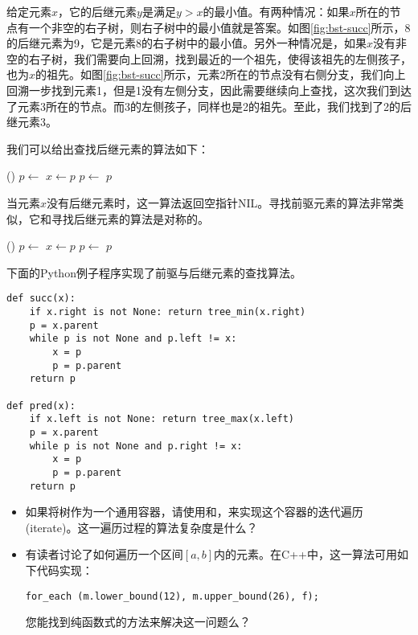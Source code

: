\documentclass[UTF8]{article}
\begin{document}
给定元素$x$，它的后继元素$y$是满足$y>x$的最小值。有两种情况：如果$x$所在的节点有一个非空的右子树，则右子树中的最小值就是答案。如图\ref{fig:bst-succ}所示，8的后继元素为9，它是元素8的右子树中的最小值。另外一种情况是，如果$x$没有非空的右子树，我们需要向上回溯，找到最近的一个祖先，使得该祖先的左侧孩子，也为$x$的祖先。如图\ref{fig:bst-succ}所示，元素2所在的节点没有右侧分支，我们向上回溯一步找到元素1，但是1没有左侧分支，因此需要继续向上查找，这次我们到达了元素3所在的节点。而3的左侧孩子，同样也是2的祖先。至此，我们找到了2的后继元素3。

我们可以给出查找后继元素的算法如下：

\begin{algorithmic}[1]
    \State \Return {}()
  \Else
    \State $p \gets $ 
      \State $x \gets p$
      \State $p \gets $ 
    \EndWhile
    \State \Return $p$
  \EndIf
\EndFunction
\end{algorithmic}

当元素$x$没有后继元素时，这一算法返回空指针NIL。寻找前驱元素的算法非常类似，它和寻找后继元素的算法是对称的。

\begin{algorithmic}[1]
    \State \Return {}()
  \Else
    \State $p \gets $ 
      \State $x \gets p$
      \State $p \gets $ 
    \EndWhile
    \State \Return $p$
  \EndIf
\EndFunction
\end{algorithmic}

下面的Python例子程序实现了前驱与后继元素的查找算法。

\lstset{language=Python}
\begin{lstlisting}
def succ(x):
    if x.right is not None: return tree_min(x.right)
    p = x.parent
    while p is not None and p.left != x:
        x = p
        p = p.parent
    return p

def pred(x):
    if x.left is not None: return tree_max(x.left)
    p = x.parent
    while p is not None and p.right != x:
        x = p
        p = p.parent
    return p
\end{lstlisting}

\begin{Exercise}

\begin{itemize}
\item 如果将树作为一个通用容器，请使用和，来实现这个容器的迭代遍历(iterate)。这一遍历过程的算法复杂度是什么？

\item 有读者讨论了如何遍历一个区间$[a, b]$内的元素。在C++中，这一算法可用如下代码实现：

\texttt{for\_each (m.lower\_bound(12), m.upper\_bound(26), f);}

您能找到纯函数式的方法来解决这一问题么？
\end{itemize}

\end{Exercise}
\end{document}
